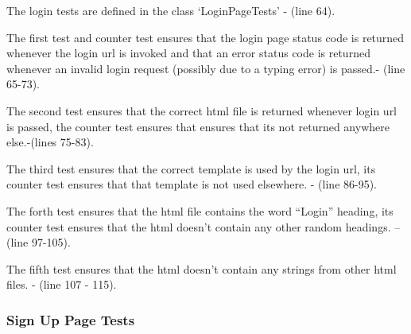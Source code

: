 \documentclass[10pt]{article}
\begin{document}
\begin{description}[font=$\bullet$~\normalfont\scshape\color{red!50!black}]

\item [] The login tests are defined in the class ‘LoginPageTests’ - (line 64).
\item [] The first test and counter test ensures that the login page status code is returned whenever the login url is invoked and that an error status  code is returned whenever an invalid login request (possibly due to a typing error) is passed.- (line 65-73).
\item [] The second test ensures that the correct html file is returned whenever login url is passed, the counter test ensures that ensures that its not returned anywhere else.-(lines 75-83).
\item [] The third test ensures that the correct template is used by the login url, its counter test ensures that that template is not used elsewhere. - (line 86-95).
\item [] The forth test ensures that the html file contains the word “Login” heading, its counter test ensures that the html doesn’t contain any other random headings. – (line 97-105).
\item [] The fifth test ensures that the html doesn’t contain any strings from other html files. - (line 107 - 115).

\end{description}

\subsubsection{Sign Up Page Tests}
\end{document}
